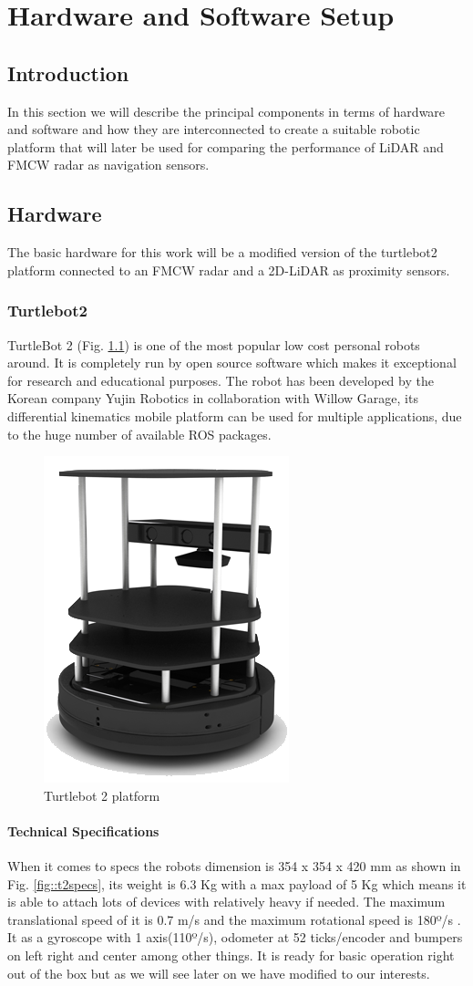 \chapter{Hardware and Software Setup}

\section{Introduction}
In this section we will describe the principal components in terms of hardware and software and how they are interconnected to create a suitable robotic platform that will later be used for comparing the performance of \ac{LiDAR} and \ac{FMCW} \ac{radar} as navigation sensors.
\section{Hardware}
The basic hardware for this work will be a  modified version of the  turtlebot2 platform connected to an \ac{FMCW} \ac{radar} and a 2D-\ac{LiDAR} as proximity sensors.
\subsection{Turtlebot2}
TurtleBot 2 (Fig. \ref{fig:t2}) is one of the  most popular low cost personal robots around. It is completely run by open source software which makes it exceptional for research and educational purposes. The robot has been developed by the Korean company Yujin Robotics in collaboration with Willow Garage, its differential kinematics mobile platform can be used for multiple applications, due to the huge number of available ROS packages.

\begin{figure}[h] 
\centerline{\includegraphics [width=0.3 \textwidth]{imgs/chapter4/turtlebot2.png}}
\caption{Turtlebot 2 platform}
\label{fig:t2}
\end{figure}
\subsubsection*{Technical Specifications}
When it comes to specs the robots dimension is 354 x 354 x 420 mm as shown in Fig. \ref{fig::t2specs}, its weight is 6.3 Kg with a max payload of 5 Kg which means it is able to attach lots of devices with relatively heavy if needed. The maximum translational  speed of it is 0.7 m/s and the maximum rotational speed is 180º/s . It as a gyroscope with 1 axis(110º/s), odometer at 52 ticks/encoder and  bumpers on left right and center among other things. It is ready for basic operation right out of the box but as we will see later on we have modified to our interests.

